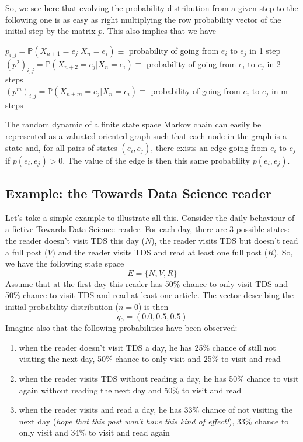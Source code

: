 So, we see here that evolving the probability distribution from a given step to the following one is as easy as right multiplying the row probability vector of the initial step by the matrix $p$. This also implies that we have

$p_{i, j}=\mathbb{P}\left(X_{n+1}=e_{j} | X_{n}=e_{i}\right) \equiv$ probability of going from $e_{i}$ to $e_{j}$ in 1 step \\
$\left(p^{2}\right)_{i, j}=\mathbb{P}\left(X_{n+2}=e_{j} | X_{n}=e_{i}\right) \equiv$ probability of going from $e_{i}$ to $e_{j}$ in 2 steps\\
$\left(p^{m}\right)_{i, j}=\mathbb{P}\left(X_{n+m}=e_{j} | X_{n}=e_{i}\right) \equiv$ probability of going from $e_{i}$ to $e_{j}$ in $\mathrm{m}$ steps

The random dynamic of a finite state space Markov chain can easily be represented as a valuated oriented graph such that each node in the graph is a state and, for all pairs of states $(e_i, e_j)$, there exists an edge going from $e_i$ to $e_j$ if $p(e_i,e_j)>0$. The value of the edge is then this same probability $p(e_i,e_j)$.

\subsection{Example: the Towards Data Science reader}

Let's take a simple example to illustrate all this. Consider the daily behaviour of a fictive Towards Data Science reader. For each day, there are 3 possible states: the reader doesn't visit TDS this day ($N$), the reader visits TDS but doesn't read a full post ($V$) and the reader visits TDS and read at least one full post ($R$). So, we have the following state space
\begin{equation}E=\{N, V, R\}\end{equation}
Assume that at the first day this reader has 50\% chance to only visit TDS and 50\% chance to visit TDS and read at least one article. The vector describing the initial probability distribution ($n=0$) is then
\begin{equation}q_{0}=(0.0,0.5,0.5)\end{equation}
Imagine also that the following probabilities have been observed:
\begin{enumerate}
\item when the reader doesn't visit TDS a day, he has 25\% chance of still not visiting the next day, 50\% chance to only visit and 25\% to visit and read

\item when the reader visits TDS without reading a day, he has 50\% chance to visit again without reading the next day and 50\% to visit and read

\item when the reader visits and read a day, he has 33\% chance of not visiting the next day (\textit{hope that this post won't have this kind of effect!}), 33\% chance to only visit and 34\% to visit and read again
\end{enumerate}


